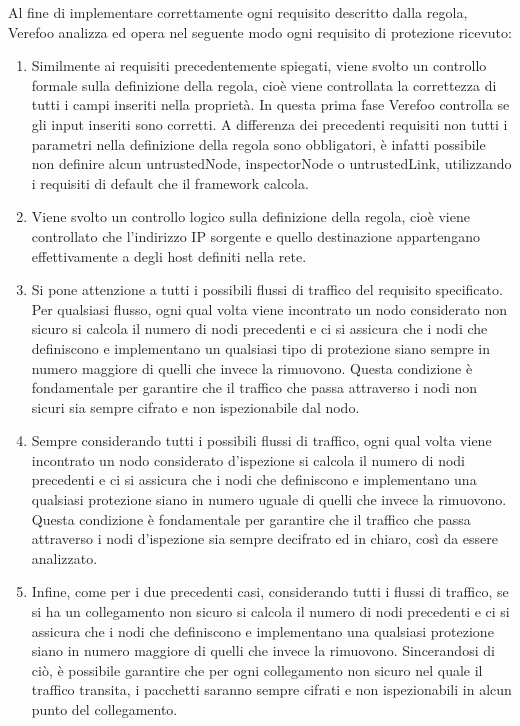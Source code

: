 Al fine di implementare correttamente ogni requisito descritto dalla regola, Verefoo analizza ed opera nel seguente modo ogni requisito di protezione ricevuto\cite{cit5}:

\begin{enumerate}
    \item  Similmente ai requisiti precedentemente spiegati, viene svolto un controllo formale sulla definizione della regola, cioè viene controllata la correttezza di tutti i campi inseriti nella proprietà. In questa prima fase
        Verefoo controlla se gli input inseriti sono corretti. A differenza dei precedenti requisiti non tutti i parametri nella definizione della regola sono obbligatori, è infatti possibile non definire alcun untrustedNode, inspectorNode o untrustedLink, 
        utilizzando i requisiti di default che il framework calcola.
    \item Viene svolto un controllo logico sulla definizione della regola, cioè viene controllato che l'indirizzo IP sorgente e quello destinazione appartengano effettivamente a degli host definiti
        nella rete.
    \item Si pone attenzione a tutti i possibili flussi di traffico del requisito specificato. Per qualsiasi flusso, ogni qual volta viene incontrato un nodo considerato non sicuro si calcola il numero di nodi precedenti e ci si assicura
        che i nodi che  definiscono e implementano un qualsiasi tipo di protezione siano  sempre in numero maggiore di quelli che invece la rimuovono. Questa condizione è fondamentale per garantire che il traffico che passa attraverso i nodi non sicuri sia 
        sempre cifrato e non ispezionabile dal nodo.
    \item Sempre considerando tutti i possibili flussi di traffico, ogni qual volta viene incontrato un nodo considerato d'ispezione si calcola il numero di nodi precedenti e ci si assicura che i nodi che definiscono  e implementano una qualsiasi protezione siano in numero uguale di quelli che invece la rimuovono.
        Questa condizione è fondamentale per garantire che il traffico che passa attraverso i nodi d'ispezione sia sempre decifrato ed in chiaro, così da essere analizzato.
    \item Infine, come per i due precedenti casi, considerando tutti i flussi di traffico, se si ha un collegamento non sicuro si calcola il numero di nodi precedenti e ci si assicura che i nodi che definiscono e implementano una qualsiasi protezione
        siano in numero maggiore di quelli che invece la rimuovono. Sincerandosi di ciò, è possibile garantire che per ogni collegamento non sicuro nel quale il traffico transita, i pacchetti saranno sempre cifrati e non ispezionabili in alcun punto del collegamento.
\end{enumerate}

